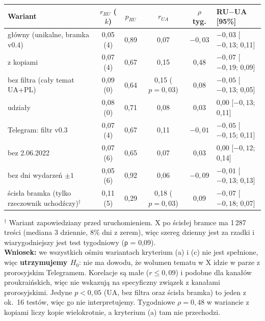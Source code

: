 \documentclass[10pt,a4paper]{article}
\begin{document}
\begin{tabularx}{\linewidth}{@{}lccccX@{}}
\toprule
Wariant & $r_{RU}$ ($k$) & $p_{RU}$ & $r_{UA}$ & $\rho$ tyg. & RU$-$UA [95\%] \\
\midrule
główny (unikalne, bramka v0.4) & 0,05 (4) & 0,89 & 0,07 & $-0{,}03$ & $-0{,}03$ [$-0{,}13$; 0,11] \\
z kopiami & 0,07 (4) & 0,67 & 0,15 & 0,48 & $-0{,}07$ [$-0{,}19$; 0,09] \\
bez filtra (cały temat UA+PL) & 0,09 (0) & 0,64 & 0,15 ($p=0{,}03$) & 0,08 & $-0{,}05$ [$-0{,}13$; 0,05] \\
udziały & 0,08 (0) & 0,71 & 0,08 & 0,03 & 0,00 [$-0{,}13$; 0,11] \\
Telegram: filtr v0.3 & 0,07 (4) & 0,67 & 0,11 & $-0{,}01$ & $-0{,}05$ [$-0{,}15$; 0,11] \\
bez 2.06.2022 & 0,07 (6) & 0,65 & 0,07 & 0,03 & 0,00 [$-0{,}12$; 0,14] \\
bez dni wydarzeń $\pm1$ & 0,05 (6) & 0,92 & 0,06 & $-0{,}09$ & $-0{,}01$ [$-0{,}13$; 0,13] \\
ścisła bramka (tylko rzeczownik uchodźczy)$^\dagger$ & 0,11 (5) & 0,29 & 0,18 ($p=0{,}03$) & 0,09 & $-0{,}07$ [$-0{,}18$; 0,07] \\
\bottomrule
\end{tabularx}

{\footnotesize $^\dagger$ Wariant zapowiedziany przed uruchomieniem. X po ścisłej bramce ma 1\,287 treści (mediana 3 dziennie, 8\% dni z zerem), więc szereg dzienny jest za rzadki i wiarygodniejszy jest test tygodniowy (ρ = 0,09).}\\[2pt]
\textbf{Wniosek:} we wszystkich ośmiu wariantach kryterium (a) i (c) nie jest spełnione, więc \textbf{utrzymujemy $H_0$}: nie ma dowodu, że wolumen tematu w X idzie w parze z prorosyjskim Telegramem. Korelacje są małe ($r\le 0{,}09$) i podobne dla kanałów proukraińskich, więc nie wskazują na specyficzny związek z kanałami prorosyjskimi. Jedyne $p<0{,}05$ (UA, bez filtra oraz ścisła bramka) to jeden z ok.\ 16 testów, więc go nie interpretujemy. Tygodniowe $\rho=0{,}48$ w wariancie z kopiami liczy kopie wielokrotnie, a kryterium (a) tam nie przechodzi.
\end{document}
